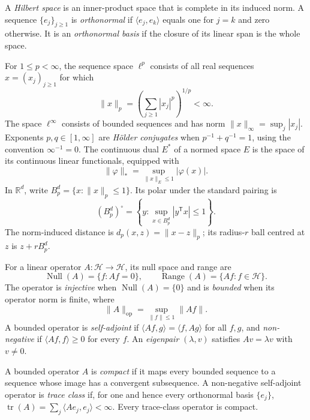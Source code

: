 \begin{definition}
A \emph{Hilbert space} is an inner-product space that is complete in its
induced norm.  A sequence $\{e_j\}_{j\geq1}$ is \emph{orthonormal} if
$\langle e_j,e_k\rangle$ equals one for $j=k$ and zero otherwise.  It is an
\emph{orthonormal basis} if the closure of its linear span is the whole
space.
\end{definition}

\begin{definition}
For $1\leq p<\infty$, the sequence space $\ell^p$ consists of all real
sequences $x=(x_j)_{j\geq1}$ for which
\[
    \|x\|_p=\left(\sum_{j\geq1}|x_j|^p\right)^{1/p}<\infty.
\]
The space $\ell^\infty$ consists of bounded sequences and has norm
$\|x\|_\infty=\sup_j|x_j|$.  Exponents $p,q\in[1,\infty]$ are
\emph{H\"older conjugates} when $p^{-1}+q^{-1}=1$, using the convention
$\infty^{-1}=0$.  The continuous dual $E^*$ of a normed space $E$ is the
space of its continuous linear functionals, equipped with
\[
    \|\varphi\|_*=\sup_{\|x\|_E\leq1}|\varphi(x)|.
\]
In $\mathbb R^d$, write $B_p^d=\{x:\|x\|_p\leq1\}$.  Its polar under the
standard pairing is
\[
    (B_p^d)^\circ
    =\left\{y:\sup_{x\in B_p^d}|y^{\mathsf T}x|\leq1\right\}.
\]
The norm-induced distance is $d_p(x,z)=\|x-z\|_p$; its radius-$r$ ball
centred at $z$ is $z+rB_p^d$.
\end{definition}

\begin{definition}
For a linear operator $A:\mathcal H\to\mathcal H$, its null space and range
are
\[
    \operatorname{Null}(A)=\{f:Af=0\},
    \qquad
    \operatorname{Range}(A)=\{Af:f\in\mathcal H\}.
\]
The operator is \emph{injective} when $\operatorname{Null}(A)=\{0\}$ and is
\emph{bounded} when its operator norm is finite, where
\[
    \|A\|_{\mathrm{op}}
    =\sup_{\|f\|\leq1}\|Af\|.
\]
A bounded operator is \emph{self-adjoint} if
$\langle Af,g\rangle=\langle f,Ag\rangle$ for all $f,g$, and
\emph{non-negative} if $\langle Af,f\rangle\geq0$ for every $f$.  An
\emph{eigenpair} $(\lambda,v)$ satisfies $Av=\lambda v$ with $v\neq0$.
\end{definition}

\begin{definition}
A bounded operator $A$ is \emph{compact} if it maps every bounded sequence to
a sequence whose image has a convergent subsequence.  A non-negative
self-adjoint operator is \emph{trace class} if, for one and hence every
orthonormal basis $\{e_j\}$,
\(
  \operatorname{tr}(A)=\sum_j\langle Ae_j,e_j\rangle<\infty.
\)
Every trace-class operator is compact.
\end{definition}

